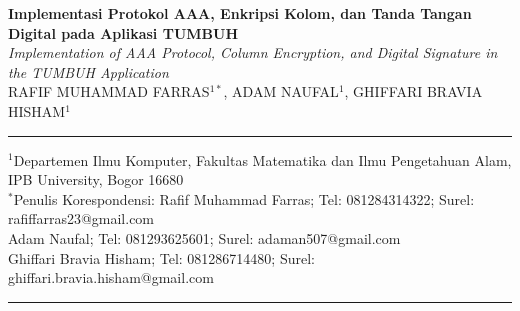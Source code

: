 \documentclass[12pt,a4paper]{article}
\begin{document}
\pagestyle{fancy}

\begin{flushleft}
{\fontsize{16pt}{20pt}\selectfont\bfseries
Implementasi Protokol AAA, Enkripsi Kolom, dan Tanda Tangan Digital
pada Aplikasi TUMBUH}\\[6pt]
{\fontsize{14pt}{17pt}\selectfont\itshape
Implementation of AAA Protocol, Column Encryption, and Digital
Signature in the TUMBUH Application}\\[10pt]
RAFIF MUHAMMAD FARRAS$^{1*}$,
ADAM NAUFAL$^{1}$,
GHIFFARI BRAVIA HISHAM$^{1}$
\end{flushleft}

\vspace{2pt}
\noindent\rule{\textwidth}{0.4pt}
\begin{flushleft}
{\fontsize{9pt}{11pt}\selectfont
$^{1}$Departemen Ilmu Komputer, Fakultas Matematika dan Ilmu
Pengetahuan Alam, IPB University, Bogor 16680\\
$^{*}$Penulis Korespondensi: Rafif Muhammad Farras;
Tel: 081284314322; Surel: rafiffarras23@gmail.com\\
Adam Naufal; Tel: 081293625601; Surel: adaman507@gmail.com\\
Ghiffari Bravia Hisham; Tel: 081286714480;
Surel: ghiffari.bravia.hisham@gmail.com}
\end{flushleft}
\noindent\rule{\textwidth}{0.4pt}

\vspace{8pt}
\end{document}
